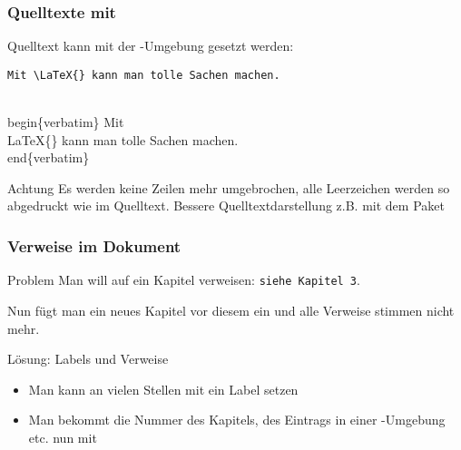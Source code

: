 \begin{frame}[fragile]
    \frametitle{Quelltexte mit }
    
    Quelltext kann mit der -Umgebung gesetzt werden:
    
    \medskip
    \begin{verbatim}
Mit \LaTeX{} kann man tolle Sachen machen.
    \end{verbatim}
    
    \pause
    \begin{semiverbatim}
\\begin\{verbatim\}
Mit \\LaTeX\{\} kann man tolle Sachen machen.
\\end\{verbatim\}
    \end{semiverbatim}
    
    \begin{alertblock}{Achtung}
        Es werden keine Zeilen mehr umgebrochen, alle Leerzeichen werden so abgedruckt wie im Quelltext. Bessere Quelltextdarstellung z.B. mit dem Paket 
    \end{alertblock}
\end{frame}


\begin{frame}[fragile]
    \frametitle{Verweise im Dokument}
    \begin{alertblock}{Problem}
        Man will auf ein Kapitel verweisen: \verb+siehe Kapitel 3+.\pause
        
        Nun fügt man ein neues Kapitel vor diesem ein und alle Verweise stimmen nicht mehr.
    \end{alertblock}
    
    \pause
    \begin{block}{Lösung: Labels und Verweise}
        \begin{itemize}
            \item Man kann an vielen Stellen mit  ein Label setzen
            \item Man bekommt die Nummer des Kapitels, des Eintrags in einer -Umgebung etc. nun mit 
        \end{itemize}
    \end{block}
\end{frame}


